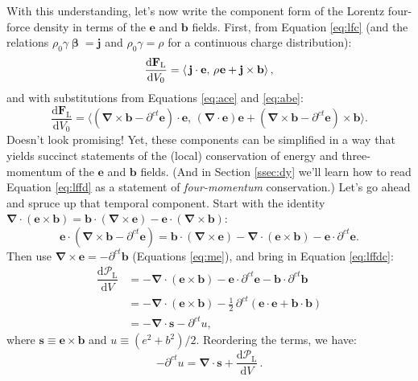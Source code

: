 \documentclass[12pt]{article}
\renewcommand{\vv}[1]{\mathbf{#1}}
\newcommand{\dd}[1]{\mathrm{d}#1}
\newcommand{\vvbeta}{\bm{\upbeta}}
\newcommand{\del}{\boldsymbol{\nabla}}
\begin{document}
With this understanding, let's now write the component form of the Lorentz four-force density in terms of the $\vv e$ and $\vv b$ fields. First, from Equation \ref{eq:lfc} (and the relations $\rho_0 \gamma \vvbeta = \vv j$ and $\rho_0 \gamma = \rho$ for a continuous charge distribution):
\begin{equation*}
\dfrac{\dd \vv F_{\mathrm{L}}}{\dd V_0} = \left \langle \, \vv j \cdot \vv e, \, \rho \mkern1mu \vv e + \vv j \times \vv b \right \rangle ,
\end{equation*}
and with substitutions from Equations \ref{eq:ace} and \ref{eq:abe}:
\begin{equation}\label{eq:lffdc2}
\dfrac{\dd \vv F_{\mathrm{L}}}{\dd V_0} = \Big \langle \left( \del \times \vv b - \partial^{ct} \vv e \right) \cdot \vv e , \, \left( \del \cdot \vv e \right) \vv e + \left( \del \times \vv b - \partial^{ct} \vv e \right) \times \vv b \Big \rangle .
\end{equation}
Doesn't look promising! Yet, these components can be simplified in a way that yields succinct statements of the (local) conservation of energy and three-momentum of the $\vv e$ and $\vv b$ fields. (And in Section \ref{ssec:dy} we'll learn how to read Equation \ref{eq:lffd} as a statement of \emph{four-momentum} conservation.) Let's go ahead and spruce up that temporal component. Start with the identity $\del \cdot (\vv e \times \vv b) = \vv b \cdot (\del \times \vv e) - \vv e \cdot (\del \times \vv b)$:
\begin{equation*}
\vv e \cdot \left( \del \times \vv b - \partial^{ct} \vv e \right) = \vv b \cdot \left( \del \times \vv e \right) - \del \cdot \left( \vv e \times \vv b \right) - \vv e \cdot \partial^{ct} \vv e .
\end{equation*}
Then use $\del \times \vv e = - \partial^{ct} \vv b$ (Equations \ref{eq:me}), and bring in Equation \ref{eq:lffdc}:
\begin{equation*}
\begin{split}
\dfrac{\dd \mathcal{P}_{\textrm{L}}}{\dd V} &= - \del \cdot \left( \vv e \times \vv b \right) - \vv e \cdot \partial^{ct} \vv e - \vv b \cdot \partial^{ct} \vv b  \\
&= - \del \cdot \left( \vv e \times \vv b \right) - \frac{1}{2} \, \partial^{ct} \left( \vv e \cdot \vv e + \vv b \cdot \vv b \right) \\[2pt]
&= - \del \cdot \vv s - \partial^{ct} u ,
\end{split}
\end{equation*}
where $\vv s \equiv \vv e \times \vv b$ and $u \equiv (e^2 + b^2)/2$. Reordering the terms, we have:
\begin{equation}\label{eq:py}
\boxed{ - \partial^{ct} u =  \del \cdot \vv s + \dfrac{\dd \mathcal{P}_{\textrm{L}}}{\dd V} } \, .
\end{equation}
\end{document}
